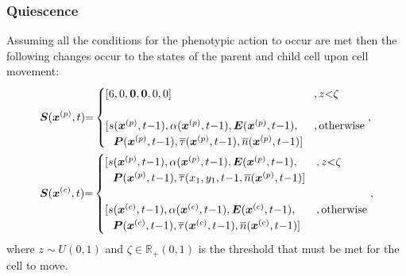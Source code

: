 \documentclass[\main/thesis.tex]{subfiles}
\begin{document}
\subsubsection{Quiescence}
Assuming all the conditions for the phenotypic action to occur are met then the 
following changes occur to the states of the parent and child cell upon cell movement:
\begin{align}
&\boldsymbol{S}(\boldsymbol{x}^{(p)}, t) {=} \begin{cases}
                     [ 6, 0, \boldsymbol{0}, \boldsymbol{0}, 0, 0 ]
                       &, z {<} \zeta \\
                       \\
                       [ s(\boldsymbol{x}^{(p)}, t{-}1), \alpha(\boldsymbol{x}^{(p)}, t{-}1), 
                        \boldsymbol{E}(\boldsymbol{x}^{(p)}, t{-}1),
                       &, \text{otherwise} \\
                       \hspace{0.25cm} \boldsymbol{P}(\boldsymbol{x}^{(p)}, t{-}1),
                       \overline{\tau}(\boldsymbol{x}^{(p)}, t{-}1),
                       \overline{n}(\boldsymbol{x}^{(p)}, t{-}1) ]
                    \end{cases}, \label{eq:QuiesenceStateChangeParent}\\
&\boldsymbol{S}(\boldsymbol{x}^{(c)}, t) {=} \begin{cases}
                     [ s(\boldsymbol{x}^{(p)}, t{-}1), \alpha(\boldsymbol{x}^{(p)}, t{-}1), 
                        \boldsymbol{E}(\boldsymbol{x}^{(p)}, t{-}1),
                       &, z {<} \zeta \\
                       \hspace{0.25cm} \boldsymbol{P}(\boldsymbol{x}^{(p)}, t{-}1),
                       \overline{\tau}(x_1, y_1, t{-}1, \overline{n}(\boldsymbol{x}^{(p)}, t{-}1) ]\\
                       \\
                       [ s(\boldsymbol{x}^{(c)}, t{-}1), \alpha(\boldsymbol{x}^{(c)}, t{-}1), 
                        \boldsymbol{E}(\boldsymbol{x}^{(c)}, t{-}1),
                       &, \text{otherwise} \\
                      \hspace{0.25cm} \boldsymbol{P}(\boldsymbol{x}^{(c)}, t{-}1),
                      \overline{\tau}(\boldsymbol{x}^{(c)}, t{-}1), \overline{n}(\boldsymbol{x}^{(c)}, t{-}1) ]
                    \end{cases}, \label{eq:QuiesenceStatechangeChild}
\end{align}
where $z {\sim} U(0, 1)$ and $\zeta {\in} \mathbb{R}_+(0, 1)$ is the threshold that must be met 
for the cell to move.
\end{document}
